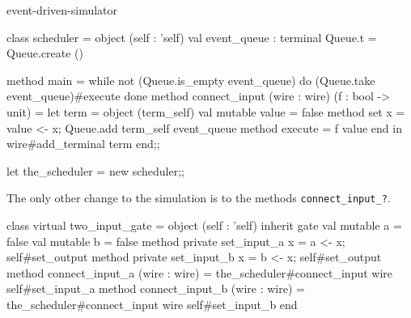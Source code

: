 \begin{exercise}{event-driven-simulator}
\begin{answer}
\begin{ocaml}
class scheduler =
object (self : 'self)
   val event_queue : terminal Queue.t = Queue.create ()

   method main =
       while not (Queue.is_empty event_queue) do
          (Queue.take event_queue)#execute
       done
   method connect_input (wire : wire) (f : bool -> unit) =
      let term =
         object (term_self)
            val mutable value = false
            method set x =
               value <- x;
               Queue.add term_self event_queue
            method execute = f value
         end
      in
      wire#add_terminal term
end;;

let the_scheduler = new scheduler;;
\end{ocaml}
%
The only other change to the simulation is to the methods \hbox{\lstinline/connect_input_?/}.

\begin{ocaml}
class virtual two_input_gate =
object (self : 'self)
   inherit gate
   val mutable a = false
   val mutable b = false
   method private set_input_a x = a <- x; self#set_output
   method private set_input_b x = b <- x; self#set_output
   method connect_input_a (wire : wire) =
      the_scheduler#connect_input wire self#set_input_a
   method connect_input_b (wire : wire) =
      the_scheduler#connect_input wire self#set_input_b
end
\end{ocaml}
\fi\end{answer}
\end{exercise}

